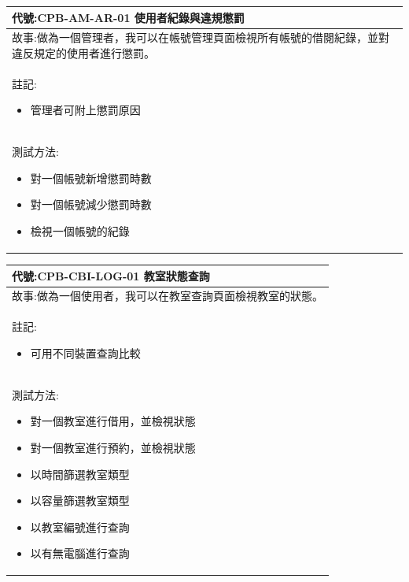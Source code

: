 \documentclass{article}
\begin{document}
\begin{table}[H]
    \begin{tabular}{| m{13cm} |}
		\hline
	代號:CPB-AM-AR-01	使用者紀錄與違規懲罰	\\ \hline
	故事:做為一個管理者，我可以在帳號管理頁面檢視所有帳號的借閱紀錄，並對違反規定的使用者進行懲罰。		\\	\hline
	註記:
	\begin{itemize}
		\item 管理者可附上懲罰原因
	\end{itemize}		\\ \hline
	測試方法:	
	\begin{itemize}
		\item 對一個帳號新增懲罰時數
		\item 對一個帳號減少懲罰時數
		\item 檢視一個帳號的紀錄
	\end{itemize}
	\\	\hline
    \end{tabular}
\end{table}

\begin{table}[H]
    \begin{tabular}{| m{13cm} |}
		\hline
	代號:CPB-CBI-LOG-01	教室狀態查詢	\\ \hline
	故事:做為一個使用者，我可以在教室查詢頁面檢視教室的狀態。		\\	\hline
	註記:
	\begin{itemize}
		\item 可用不同裝置查詢比較
	\end{itemize}		\\ \hline
	測試方法:	
	\begin{itemize}
		\item 對一個教室進行借用，並檢視狀態
		\item 對一個教室進行預約，並檢視狀態
		\item 以時間篩選教室類型
		\item 以容量篩選教室類型
		\item 以教室編號進行查詢
		\item 以有無電腦進行查詢
	\end{itemize}
	\\	\hline
    \end{tabular}
\end{table}
\end{document}
